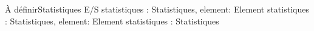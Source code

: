 	{À définir}{Statistiques}
	{E/S statistiques : Statistiques, element: Element}
	{statistiques : Statistiques, element: Element}{\naturel}
	{statistiques : Statistiques}{\naturel}
